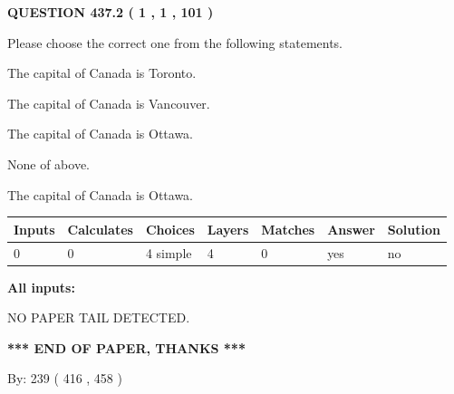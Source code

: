 \documentclass[12pt]{article}
\begin{document}
   
  
\vspace{0.2in}
  
{\textbf{\Large{QUESTION
437.2 
 ( 1 , 1 , 101 )
}}}
  
  
Please choose the correct one from the following statements.
 
 
The capital of Canada is Toronto.
 
 
The capital of Canada is Vancouver.
 
 
The capital of Canada is Ottawa.
 
 
 None of above.
 
 
\noindent{}
 
 
The capital of Canada is Ottawa.
 
 
\noindent{}
 
 
   
   
   
   
\noindent\begin{tabular}{|l|l|l|l|l|l|l|}
 \hline
Inputs & Calculates & Choices & Layers & Matches & Answer & Solution \\ \hline
 0  & 
 0  & 
 4
  simple  
  & 
 4  & 
 0  & 
  yes & 
  no 
  \\ \hline
 \end{tabular}
   
   
   
   
\noindent{}
   
   
   
   
\noindent\vspace{0.1in}\hspace{-0.08in} {\textbf{\Large{All inputs: }}}
   
   
   
   
\vspace{2.0in} NO PAPER TAIL DETECTED.
   
   
   
   
\vspace{1.0in} 
{\textbf{\large{ *** END OF PAPER, THANKS *** }}} 
   
   
\hspace{1.0in} By: 
 239 ( 416 ,  458 )
   
\end{document}

